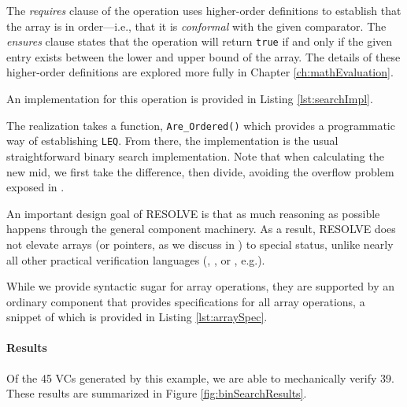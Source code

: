 The \emph{requires} clause of the operation uses higher-order definitions to establish that the array is in order---i.e., that it is \emph{conformal} with the given comparator.  The \emph{ensures} clause states that the operation will return \texttt{true} if and only if the given entry exists between the lower and upper bound of the array.  The details of these higher-order definitions are explored more fully in Chapter \ref{ch:mathEvaluation}.

An implementation for this operation is provided in Listing \ref{lst:searchImpl}.



The realization takes a function, \texttt{Are\_Ordered()} which provides a programmatic way of establishing \texttt{LEQ}.  From there, the implementation is the usual straightforward binary search implementation.  Note that when calculating the new mid, we first take the difference, then divide, avoiding the overflow problem exposed in \cite{blochBinarySearch}.

An important design goal of RESOLVE is that as much reasoning as possible happens through the general component machinery.  As a result, RESOLVE does not elevate arrays (or pointers, as we discuss in \cite{kulczyckiPointers}) to special status, unlike nearly all other practical verification languages (\cite{DafnyOverview}, \cite{cok:esc}, or \cite{kuncakJahobOverview}, e.g.).

\FloatBarrier

While we provide syntactic sugar for array operations, they are supported by an ordinary component that provides specifications for all array operations, a snippet of which is provided in Listing \ref{lst:arraySpec}.



\paragraph{Results} Of the 45 VCs generated by this example, we are able to mechanically verify 39.  These results are summarized in Figure \ref{fig:binSearchResults}.

